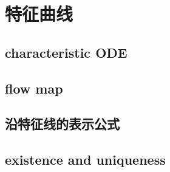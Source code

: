 \section{特征曲线}
\label{b2:sec:0702}


\subsection{characteristic ODE}
\label{b2:subsec:070201}

\subsection{flow map}
\label{b2:subsec:070202}

\subsection{沿特征线的表示公式}
\label{b2:subsec:070203}

\subsection{existence and uniqueness}
\label{b2:subsec:070204}


